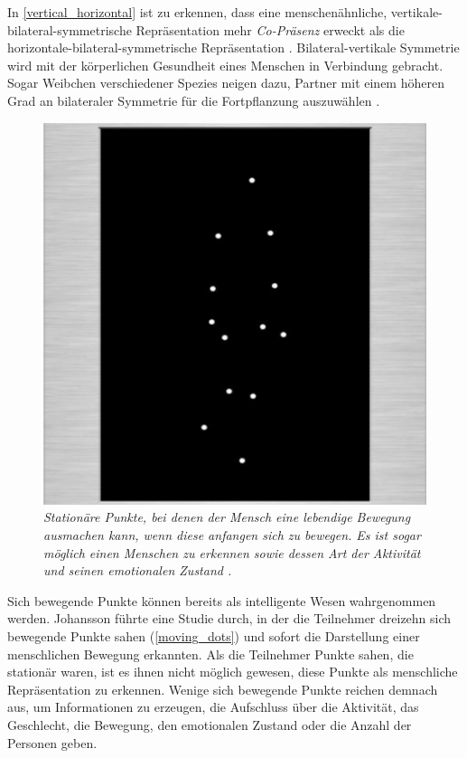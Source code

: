 \documentclass[a4paper,11pt]{article}%
\renewcommand{\\}{\vspace*{0.5\baselineskip} \newline}
\begin{document}
In \autoref{vertical_horizontal} ist zu erkennen, dass eine menschenähnliche, vertikale-bilateral-symmetrische Repräsentation mehr \textit{Co-Präsenz} erweckt als die horizontale-bilateral-symmetrische Repräsentation \citep[S. 546-551]{thornhill1998relative}.
Bilateral-vertikale Symmetrie wird mit der körperlichen Gesundheit eines Menschen in Verbindung gebracht. Sogar Weibchen verschiedener Spezies neigen dazu, Partner mit einem höheren Grad an bilateraler Symmetrie für die Fortpflanzung auszuwählen \citep[S. 659–669]{rhodes1998facial} \citep{biocca2002defining} \citep[S. 233–242]{grammer1994human}.

\begin{figure}[b!]
		\begin{footnotesize}
		\centering
			\includegraphics[scale= 0.5]{Abbildungen/moving_dots.JPG}
			\caption[Moving dots]{\textit{Stationäre Punkte, bei denen der Mensch eine lebendige Bewegung ausmachen kann, wenn diese anfangen sich zu bewegen. Es ist sogar möglich einen Menschen zu erkennen sowie dessen Art der Aktivität und seinen emotionalen Zustand \citep{biocca2002defining} \citep[S. 76-89]{johansson1975visual}.}}
			\label{moving_dots}
		\end{footnotesize}
	\end{figure}

Sich bewegende Punkte können bereits als intelligente Wesen wahrgenommen werden. Johansson \citep[S. 76-89]{johansson1975visual} führte eine Studie durch, in der die Teilnehmer dreizehn sich bewegende Punkte sahen (\autoref{moving_dots}) und sofort die Darstellung einer menschlichen Bewegung erkannten. Als die Teilnehmer Punkte sahen, die stationär waren, ist es ihnen nicht möglich gewesen, diese Punkte als menschliche Repräsentation zu erkennen. Wenige sich bewegende Punkte reichen demnach aus, um Informationen zu erzeugen, die Aufschluss über die Aktivität, das Geschlecht, die Bewegung, den emotionalen Zustand oder die Anzahl der Personen geben.
\end{document}
